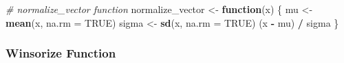 \documentclass[
]{article}
\newenvironment{Shaded}{\begin{snugshade}}{\end{snugshade}}
\newcommand{\AttributeTok}[1]{\textcolor[rgb]{0.13,0.29,0.53}{#1}}
\newcommand{\CommentTok}[1]{\textcolor[rgb]{0.56,0.35,0.01}{\textit{#1}}}
\newcommand{\ConstantTok}[1]{\textcolor[rgb]{0.56,0.35,0.01}{#1}}
\newcommand{\ControlFlowTok}[1]{\textcolor[rgb]{0.13,0.29,0.53}{\textbf{#1}}}
\newcommand{\FunctionTok}[1]{\textcolor[rgb]{0.13,0.29,0.53}{\textbf{#1}}}
\newcommand{\NormalTok}[1]{#1}
\newcommand{\OtherTok}[1]{\textcolor[rgb]{0.56,0.35,0.01}{#1}}
\newcommand{\SpecialCharTok}[1]{\textcolor[rgb]{0.81,0.36,0.00}{\textbf{#1}}}
\begin{document}
\begin{Shaded}
\begin{Highlighting}[]
\CommentTok{\# normalize\_vector function}
\NormalTok{normalize\_vector }\OtherTok{\textless{}{-}} \ControlFlowTok{function}\NormalTok{(x) \{}
\NormalTok{  mu }\OtherTok{\textless{}{-}} \FunctionTok{mean}\NormalTok{(x, }\AttributeTok{na.rm =} \ConstantTok{TRUE}\NormalTok{)}
\NormalTok{  sigma }\OtherTok{\textless{}{-}} \FunctionTok{sd}\NormalTok{(x, }\AttributeTok{na.rm =} \ConstantTok{TRUE}\NormalTok{)}
\NormalTok{  (x }\SpecialCharTok{{-}}\NormalTok{ mu) }\SpecialCharTok{/}\NormalTok{ sigma}
\NormalTok{\}}
\end{Highlighting}
\end{Shaded}

\subsubsection{Winsorize Function}\label{winsorize-function}
\end{document}
